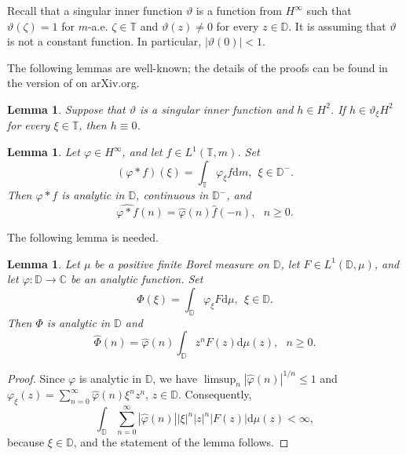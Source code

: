 \documentclass[a4paper,oneside,11pt]{amsart}
\numberwithin{equation}{section}
\theoremstyle{plain}
\newtheorem{lemma}[theorem]{Lemma}
\theoremstyle{definition}
\begin{document}
Recall that a singular inner function $\vartheta$ is a function from $H^\infty$ such that $\vartheta(\zeta)=1$  
for $m$-a.e. $\zeta\in\mathbb T$ and $\vartheta(z)\neq 0$ for every $z\in\mathbb D$. It is assuming that $\vartheta$   is not a constant function. In particular, $|\vartheta(0)|<1$.  

The following lemmas are well-known; the details of the proofs can be found in the version of \cite{g19} on arXiv.org.
 
\begin{lemma}\label{lemmutually} Suppose that $\vartheta$ is a singular inner function and $h\in H^2$. If 
$ h\in\vartheta_\xi H^2$ for every $\xi\in\mathbb T$, then $h\equiv 0$. 
\end{lemma}

\begin{lemma}\label{lemphitt} Let $\varphi\in H^\infty$, and let $f\in L^1(\mathbb T,m)$. Set 
 \begin{equation*} 
(\varphi\ast f)(\xi)=\int_{\mathbb T}\varphi_\xi f\mathrm{d}m, \ \  \xi\in \mathbb D^-. \end{equation*} 
Then $\varphi\ast f$ is analytic in $\mathbb D$, continuous in $\mathbb D^-$, and 
\begin{equation*}\widehat{\varphi\ast f}(n)=\widehat\varphi(n)\widehat f(-n),  \ \ \ n\geq 0.\end{equation*}
\end{lemma}

The following lemma is  needed.

\begin{lemma}\label{lemphidd} 
Let $\mu$ be a positive finite Borel measure on $\mathbb D$,  let $F\in L^1(\mathbb D,\mu)$, 
and let $\varphi\colon\mathbb D\to\mathbb C$ be an analytic function.
Set 
 \begin{equation*} 
\Phi(\xi)=\int_{\mathbb D}\varphi_\xi F\mathrm{d}\mu, \ \  \xi\in \mathbb D . \end{equation*} 
Then $\Phi$ is analytic in $\mathbb D$  
 and
\begin{equation*}\widehat{\Phi}(n)=\widehat\varphi(n)\int_{\mathbb D}z^n F(z)\mathrm{d}\mu(z), \ \ \ n\geq 0.\end{equation*}
\end{lemma}

\begin{proof} Since $\varphi$ is analytic in $\mathbb D$, we have  $\limsup_n|\widehat\varphi(n)|^{1/n}\leq 1$ and 
$\varphi_\xi(z)=\sum_{n=0}^\infty\widehat\varphi(n)\xi^nz^n$, $z\in\mathbb D$. Consequently, 
\begin{equation*} 
\int_{\mathbb D}\sum_{n=0}^\infty|\widehat\varphi(n)||\xi|^n |z|^n | F(z)|\mathrm{d}\mu(z)<\infty, \end{equation*} 
because $\xi\in\mathbb D$, and the statement of the lemma follows.
\end{proof}
\end{document}
